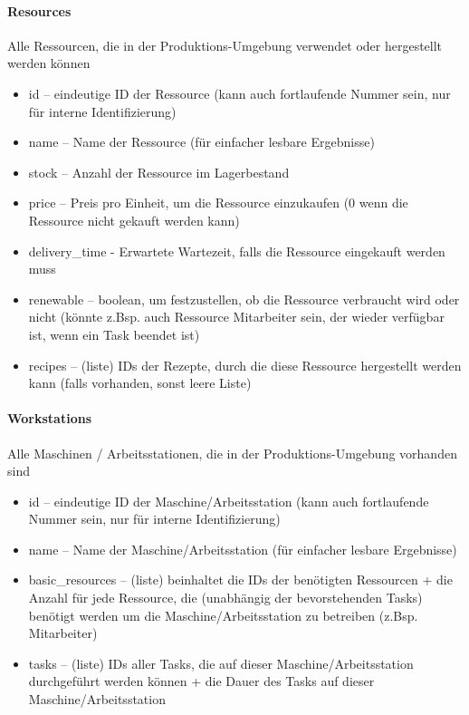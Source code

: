 \documentclass[a4paper,12pt,twoside]{scrreprt}
\begin{document}
\paragraph*{Resources}
Alle Ressourcen, die in der Produktions-Umgebung verwendet oder hergestellt werden können
\begin{itemize}
	\item id – eindeutige ID der Ressource (kann auch fortlaufende Nummer sein, nur für interne Identifizierung)
	\item name – Name der Ressource (für einfacher lesbare Ergebnisse)
	\item stock – Anzahl der Ressource im Lagerbestand
	\item price – Preis pro Einheit, um die Ressource einzukaufen (0 wenn die Ressource nicht gekauft werden kann)
	\item delivery\_time - Erwartete Wartezeit, falls die Ressource eingekauft werden muss
	\item renewable – boolean, um festzustellen, ob die Ressource verbraucht wird oder nicht (könnte z.Bsp. auch Ressource Mitarbeiter sein, der wieder verfügbar ist, wenn ein Task beendet ist)
	\item recipes – (liste) IDs der Rezepte, durch die diese Ressource hergestellt werden kann (falls vorhanden, sonst leere Liste)
\end{itemize}
\paragraph*{Workstations}
\label{workstation}
Alle Maschinen / Arbeitsstationen, die in der Produktions-Umgebung vorhanden sind
\begin{itemize}
	\item id – eindeutige ID der Maschine/Arbeitsstation (kann auch fortlaufende Nummer sein, nur für interne Identifizierung)
	\item name – Name der Maschine/Arbeitsstation (für einfacher lesbare Ergebnisse)
	\item basic\_resources – (liste) beinhaltet die IDs der benötigten Ressourcen + die Anzahl für jede Ressource, die (unabhängig der bevorstehenden Tasks) benötigt werden um die Maschine/Arbeitsstation zu betreiben (z.Bsp. Mitarbeiter)
	\item tasks – (liste) IDs aller Tasks, die auf dieser Maschine/Arbeitsstation durchgeführt werden können + die Dauer des Tasks auf dieser Maschine/Arbeitsstation
\end{itemize}
\end{document}
